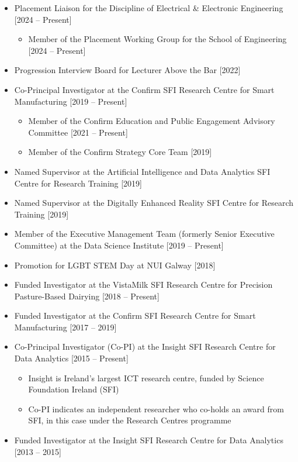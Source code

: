 \documentclass[10pt,a4paper]{res} %
\begin{document}
\begin{resume}
\begin{itemize} \itemsep -2pt
\item Placement Liaison for the Discipline of Electrical \& Electronic Engineering [2024 -- Present]
\begin{itemize} \itemsep -2pt
\item Member of the Placement Working Group for the School of Engineering [2024 -- Present]
\end{itemize}
\item Progression Interview Board for Lecturer Above the Bar [2022]
\item Co-Principal Investigator at the Confirm SFI Research Centre for Smart Manufacturing [2019 -- Present]
\begin{itemize} \itemsep -2pt
\item Member of the Confirm Education and Public Engagement Advisory Committee [2021 -- Present]
\item Member of the Confirm Strategy Core Team [2019]
\end{itemize}
\item Named Supervisor at the Artificial Intelligence and Data Analytics SFI Centre for Research Training [2019]
\item Named Supervisor at the Digitally Enhanced Reality SFI Centre for Research Training [2019]
\item Member of the Executive Management Team (formerly Senior Executive Committee) at the Data Science Institute [2019 -- Present]
\item Promotion for LGBT STEM Day at NUI Galway [2018]
\item Funded Investigator at the VistaMilk SFI Research Centre for Precision Pasture-Based Dairying [2018 -- Present]
\item Funded Investigator at the Confirm SFI Research Centre for Smart Manufacturing [2017 -- 2019]
\item Co-Principal Investigator (Co-PI) at the Insight SFI Research Centre for Data Analytics [2015 -- Present]
\begin{itemize} \itemsep -2pt
\item Insight is Ireland's largest ICT research centre, funded by Science Foundation Ireland (SFI)
\item Co-PI indicates an independent researcher who co-holds an award from SFI, in this case under the Research Centres programme
\end{itemize}
\item Funded Investigator at the Insight SFI Research Centre for Data Analytics [2013 -- 2015]

\end{itemize}
\end{resume}
\end{document}
